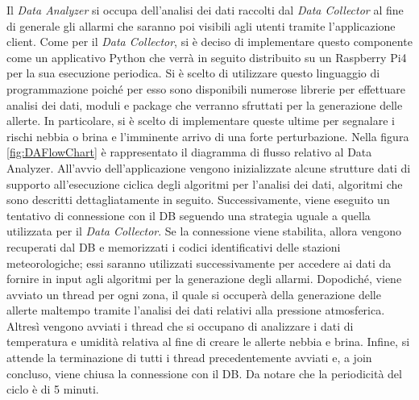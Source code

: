 Il \textit{Data Analyzer} si occupa dell'analisi dei dati raccolti dal \textit{Data Collector} al fine di generale gli allarmi che saranno poi visibili agli utenti tramite l'applicazione client. Come per il \textit{Data Collector}, si è deciso di implementare questo componente come un applicativo Python che verrà in seguito distribuito su un Raspberry Pi4 per la sua esecuzione periodica. Si è scelto di utilizzare questo linguaggio di programmazione poiché per esso sono disponibili numerose librerie per effettuare analisi dei dati, moduli e package che verranno sfruttati per la generazione delle allerte. In particolare, si è scelto di implementare queste ultime per segnalare i rischi nebbia o brina e l'imminente arrivo di una forte perturbazione. Nella figura \ref{fig:DAFlowChart} è rappresentato il diagramma di flusso relativo al Data Analyzer. All'avvio dell'applicazione vengono inizializzate alcune strutture dati di supporto all'esecuzione ciclica degli algoritmi per l'analisi dei dati, algoritmi che sono descritti dettagliatamente in seguito. Successivamente, viene eseguito un tentativo di connessione con il DB seguendo una strategia uguale a quella utilizzata per il \textit{Data Collector}. Se la connessione viene stabilita, allora vengono recuperati dal DB e memorizzati i codici identificativi delle stazioni meteorologiche; essi saranno utilizzati successivamente per accedere ai dati da fornire in input agli algoritmi per la generazione degli allarmi. Dopodiché, viene avviato un thread per ogni zona, il quale si occuperà della generazione delle allerte maltempo tramite l'analisi dei dati relativi alla pressione atmosferica. Altresì vengono avviati i thread che si occupano di analizzare i dati di temperatura e umidità relativa al fine di creare le allerte nebbia e brina. Infine, si attende la terminazione di tutti i thread precedentemente avviati e, a join concluso, viene chiusa la connessione con il DB. Da notare che la periodicità del ciclo è di 5 minuti. 

